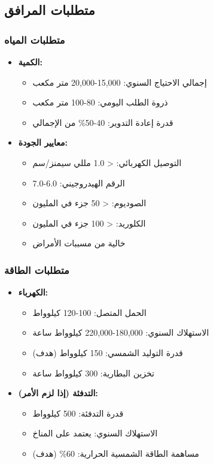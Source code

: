 \subsection{متطلبات المرافق}

\subsubsection{متطلبات المياه}
\begin{itemize}
    \item \textbf{الكمية:}
    \begin{itemize}
        \item إجمالي الاحتياج السنوي: 15,000-20,000 متر مكعب
        \item ذروة الطلب اليومي: 80-100 متر مكعب
        \item قدرة إعادة التدوير: 40-50\% من الإجمالي
    \end{itemize}
    
    \item \textbf{معايير الجودة:}
    \begin{itemize}
        \item التوصيل الكهربائي: < 1.0 مللي سيمنز/سم
        \item الرقم الهيدروجيني: 6.0-7.0
        \item الصوديوم: < 50 جزء في المليون
        \item الكلوريد: < 100 جزء في المليون
        \item خالية من مسببات الأمراض
    \end{itemize}
\end{itemize}

\subsubsection{متطلبات الطاقة}
\begin{itemize}
    \item \textbf{الكهرباء:}
    \begin{itemize}
        \item الحمل المتصل: 100-120 كيلوواط
        \item الاستهلاك السنوي: 180,000-220,000 كيلوواط ساعة
        \item قدرة التوليد الشمسي: 150 كيلوواط (هدف)
        \item تخزين البطارية: 300 كيلوواط ساعة
    \end{itemize}
    
    \item \textbf{التدفئة (إذا لزم الأمر):}
    \begin{itemize}
        \item قدرة التدفئة: 500 كيلوواط
        \item الاستهلاك السنوي: يعتمد على المناخ
        \item مساهمة الطاقة الشمسية الحرارية: 60\% (هدف)
    \end{itemize}
\end{itemize}

